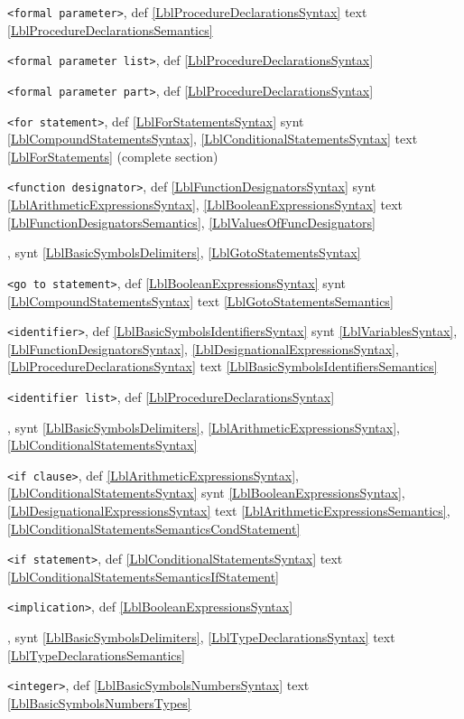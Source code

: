 \documentclass[a4paper,11pt]{article}
\begin{document}
\texttt{<formal parameter>},
def
\ref{LblProcedureDeclarationsSyntax}
text
\ref{LblProcedureDeclarationsSemantics}\*

\texttt{<formal parameter list>},
def
\ref{LblProcedureDeclarationsSyntax}\*

\texttt{<formal parameter part>},
def
\ref{LblProcedureDeclarationsSyntax}\*

\texttt{<for statement>},
def
\ref{LblForStatementsSyntax}
synt
\ref{LblCompoundStatementsSyntax},
\ref{LblConditionalStatementsSyntax}
text
\ref{LblForStatements} (complete section)\*

\texttt{<function designator>},
def
\ref{LblFunctionDesignatorsSyntax}
synt
\ref{LblArithmeticExpressionsSyntax},
\ref{LblBooleanExpressionsSyntax}
text
\ref{LblFunctionDesignatorsSemantics},
\ref{LblValuesOfFuncDesignators}\*

,
synt
\ref{LblBasicSymbolsDelimiters},
\ref{LblGotoStatementsSyntax}\*

\texttt{<go to statement>},
def
\ref{LblBooleanExpressionsSyntax}
synt
\ref{LblCompoundStatementsSyntax}
text
\ref{LblGotoStatementsSemantics}\*

\texttt{<identifier>},
def
\ref{LblBasicSymbolsIdentifiersSyntax}
synt
\ref{LblVariablesSyntax},
\ref{LblFunctionDesignatorsSyntax},
\ref{LblDesignationalExpressionsSyntax},
\ref{LblProcedureDeclarationsSyntax}
text
\ref{LblBasicSymbolsIdentifiersSemantics}\*

\texttt{<identifier list>},
def
\ref{LblProcedureDeclarationsSyntax}\*

,
synt
\ref{LblBasicSymbolsDelimiters},
\ref{LblArithmeticExpressionsSyntax},
\ref{LblConditionalStatementsSyntax}\*

\texttt{<if clause>},
def
\ref{LblArithmeticExpressionsSyntax},
\ref{LblConditionalStatementsSyntax}
synt
\ref{LblBooleanExpressionsSyntax},
\ref{LblDesignationalExpressionsSyntax}
text
\ref{LblArithmeticExpressionsSemantics},
\ref{LblConditionalStatementsSemanticsCondStatement}\*

\texttt{<if statement>},
def
\ref{LblConditionalStatementsSyntax}
text
\ref{LblConditionalStatementsSemanticsIfStatement}\*

\texttt{<implication>},
def
\ref{LblBooleanExpressionsSyntax}\*

,
synt
\ref{LblBasicSymbolsDelimiters},
\ref{LblTypeDeclarationsSyntax}
text
\ref{LblTypeDeclarationsSemantics}\*

\texttt{<integer>},
def
\ref{LblBasicSymbolsNumbersSyntax}
text
\ref{LblBasicSymbolsNumbersTypes}\*
\end{document}
